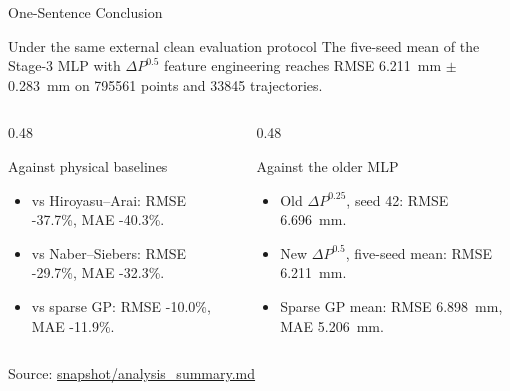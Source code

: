 \documentclass[aspectratio=169,11pt]{beamer}
\newcommand{\good}[1]{\textcolor{goodGreen}{#1}}
\newcommand{\sourcenote}[1]{\vfill{\tiny\textcolor{gray!70!black}{Source: \url{#1}}}}
\begin{document}
\begin{frame}{One-Sentence Conclusion}
\small
\begin{block}{Under the same external clean evaluation protocol}
The five-seed mean of the Stage-3 MLP with \(\Delta P^{0.5}\) feature engineering reaches
\good{RMSE \SI{6.211}{mm} \(\pm\) \SI{0.283}{mm}}
on \num{795561} points and \num{33845} trajectories.
\end{block}

\vspace{0.4em}
\begin{columns}[T,onlytextwidth]
\begin{column}{0.48\linewidth}
\begin{block}{Against physical baselines}
\begin{itemize}
  \item vs Hiroyasu--Arai: RMSE \good{-37.7\%}, MAE \good{-40.3\%}.
  \item vs Naber--Siebers: RMSE \good{-29.7\%}, MAE \good{-32.3\%}.
  \item vs sparse GP: RMSE \good{-10.0\%}, MAE \good{-11.9\%}.
\end{itemize}
\end{block}
\end{column}

\begin{column}{0.48\linewidth}
\begin{block}{Against the older MLP}
\begin{itemize}
  \item Old \(\Delta P^{0.25}\), seed 42: RMSE \SI{6.696}{mm}.
  \item New \(\Delta P^{0.5}\), five-seed mean: RMSE \SI{6.211}{mm}.
  \item Sparse GP mean: RMSE \SI{6.898}{mm}, MAE \SI{5.206}{mm}.
\end{itemize}
\end{block}
\end{column}
\end{columns}

\sourcenote{snapshot/analysis_summary.md}
\end{frame}
\end{document}
